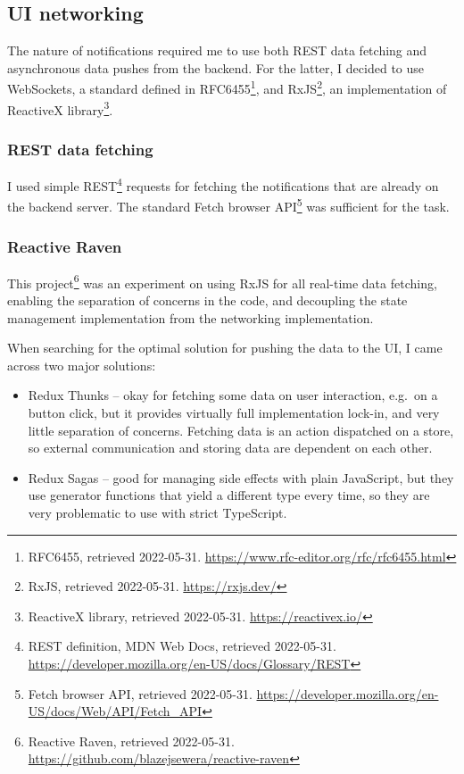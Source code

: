 \hypertarget{ui-networking}{%
	\subsection{UI networking}\label{ui-networking}}

The nature of notifications required me to use both REST data fetching
and asynchronous data pushes from the backend. For the latter, I decided
to use WebSockets, a standard defined in RFC6455\footnote{RFC6455,
	retrieved 2022-05-31.
	\url{https://www.rfc-editor.org/rfc/rfc6455.html}}, and
RxJS\footnote{RxJS, retrieved 2022-05-31. \url{https://rxjs.dev/}}, an
implementation of ReactiveX library\footnote{ReactiveX library,
	retrieved 2022-05-31. \url{https://reactivex.io/}}.

\hypertarget{rest-data-fetching}{%
	\subsubsection{REST data fetching}\label{rest-data-fetching}}

I used simple REST\footnote{REST definition, MDN Web Docs, retrieved
	2022-05-31.
	\url{https://developer.mozilla.org/en-US/docs/Glossary/REST}} requests
for fetching the notifications that are already on the backend server.
The standard Fetch browser API\footnote{Fetch browser API, retrieved
	2022-05-31.
	\url{https://developer.mozilla.org/en-US/docs/Web/API/Fetch_API}} was
sufficient for the task.

\hypertarget{reactive-raven}{%
	\subsubsection{Reactive Raven}\label{reactive-raven}}

This project\footnote{Reactive Raven, retrieved 2022-05-31.
	\url{https://github.com/blazejsewera/reactive-raven}} was an
experiment on using RxJS for all real-time data fetching, enabling the
separation of concerns in the code, and decoupling the state management
implementation from the networking implementation.

When searching for the optimal solution for pushing the data to the UI,
I came across two major solutions:

\begin{itemize}
	\tightlist
	\item
	      Redux Thunks -- okay for fetching some data on user interaction,
	      e.g.~on a button click, but it provides virtually full implementation
	      lock-in, and very little separation of concerns. Fetching data is an
	      action dispatched on a store, so external communication and storing
	      data are dependent on each other.
	\item
	      Redux Sagas -- good for managing side effects with plain JavaScript,
	      but they use generator functions that yield a different type every
	      time, so they are very problematic to use with strict TypeScript.
\end{itemize}

